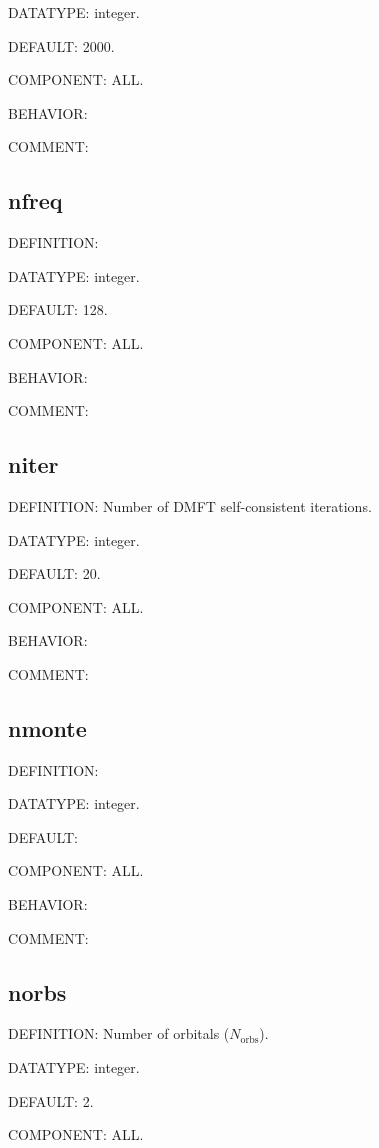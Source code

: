 {\color{green}DATATYPE:} integer.

{\color{blue}DEFAULT:} 2000.

{\color{brown}COMPONENT:} ALL.

{\color{purple}BEHAVIOR:}

{\color{olive}COMMENT:}

\subsection{nfreq}
{\color{red}DEFINITION:}

{\color{green}DATATYPE:} integer.

{\color{blue}DEFAULT:} 128.

{\color{brown}COMPONENT:} ALL.

{\color{purple}BEHAVIOR:}

{\color{olive}COMMENT:}

\subsection{niter}
{\color{red}DEFINITION:} Number of DMFT self-consistent iterations.

{\color{green}DATATYPE:} integer.

{\color{blue}DEFAULT:} 20.

{\color{brown}COMPONENT:} ALL.

{\color{purple}BEHAVIOR:}

{\color{olive}COMMENT:}

\subsection{nmonte}
{\color{red}DEFINITION:}

{\color{green}DATATYPE:} integer.

{\color{blue}DEFAULT:}

{\color{brown}COMPONENT:} ALL.

{\color{purple}BEHAVIOR:}

{\color{olive}COMMENT:}

\subsection{norbs}
{\color{red}DEFINITION:} Number of orbitals ($N_{\text{orbs}}$).

{\color{green}DATATYPE:} integer.

{\color{blue}DEFAULT:} 2.

{\color{brown}COMPONENT:} ALL.

